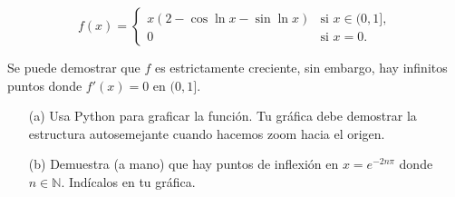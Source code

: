 \documentclass{article}
\begin{document}
\[
f(x) = 
\begin{cases} 
x \left( 2 - \cos \ln x - \sin \ln x \right) & \text{si } x \in (0, 1], \\
0 & \text{si } x = 0.
\end{cases}
\]

Se puede demostrar que \(f\) es estrictamente creciente, sin embargo, hay infinitos puntos donde \(f'(x) = 0\) en \((0, 1]\).

\begin{itemize}
    \item[(a)] Usa Python para graficar la función. Tu gráfica debe demostrar la estructura autosemejante cuando hacemos zoom hacia el origen.
    
    \item[(b)] Demuestra (a mano) que hay puntos de inflexión en \(x = e^{-2n\pi}\) donde \(n \in \mathbb{N}\). Indícalos en tu gráfica.
\end{itemize}
\end{document}
